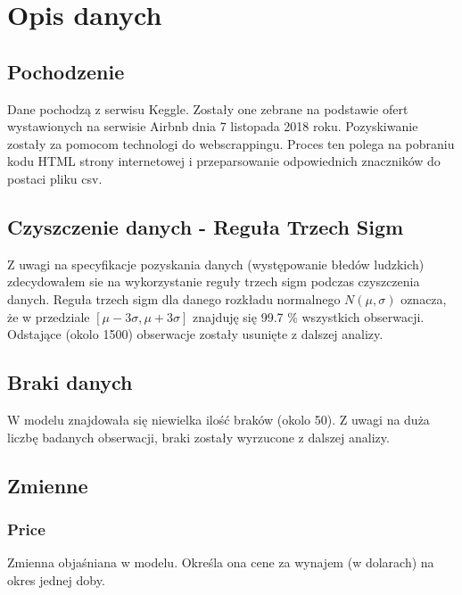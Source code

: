 \section{Opis danych}\label{sec:opis-danych}

\subsection{Pochodzenie}\label{subsec:pochodzenie}
Dane pochodzą z serwisu Keggle\cite{berlin-airbnb-data}.
Zostały one zebrane na podstawie ofert wystawionych na serwisie Airbnb dnia 7 listopada 2018 roku.
Pozyskiwanie zostały za pomocom technologi do webscrappingu.
Proces ten polega na pobraniu kodu HTML strony internetowej i przeparsowanie odpowiednich znaczników do postaci pliku csv.

\subsection{Czyszczenie danych - Reguła Trzech Sigm}\label{subsec:czyszczenie-danych-reguła-trzech-sigm}

Z uwagi na specyfikacje pozyskania danych (występowanie błedów ludzkich) zdecydowałem sie na wykorzystanie reguły trzech sigm podczas czyszczenia danych.
Reguła trzech sigm dla danego rozkładu normalnego \(N(\mu , \sigma)\) oznacza, że w przedziale \([\mu - 3\sigma ,\mu + 3\sigma ] \) znajduję się 99.7 \% wszystkich obserwacji.
Odstające (okolo 1500) obserwacje zostały usunięte z dalszej analizy.

\subsection{Braki danych}\label{subsec:problem-braku-danych}
W modelu znajdowała się niewielka ilość braków (okolo 50).
Z uwagi na duża liczbę badanych obserwacji, braki zostały wyrzucone z dalszej analizy.

\subsection{Zmienne}\label{subsec:zmienne}


\subsubsection{Price}\label{subsubsec:price}
Zmienna objaśniana w modelu.
Określa ona cene za wynajem (w dolarach) na okres jednej doby.


